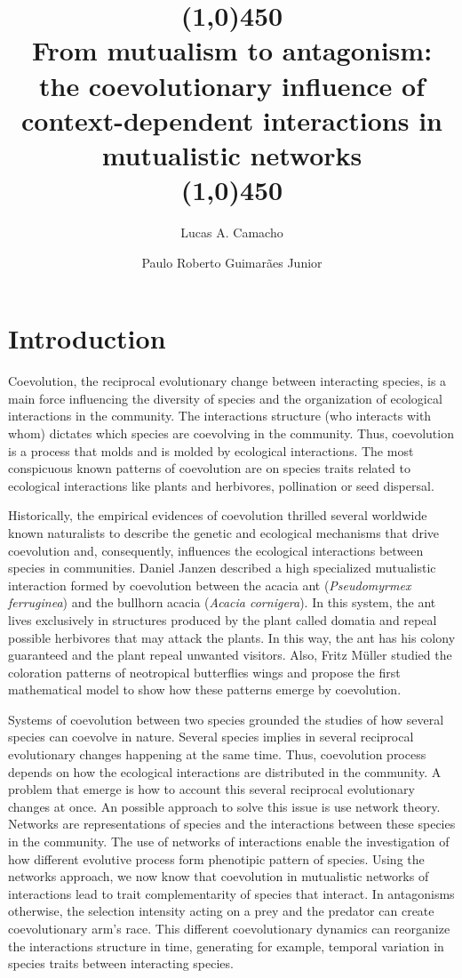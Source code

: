 \documentclass[a4paper, 12pt]{article}
\title{\vspace{-1.0cm} \line(1,0){450} \\From mutualism to antagonism: the coevolutionary influence of  context-dependent interactions in mutualistic networks\\\line(1,0){450}}
\author[1]{Lucas A. Camacho}
\author[2]{Paulo Roberto Guimarães Junior}
\date{}
\affil[1,2]{Departamento de Ecologia, Universidade de São Paulo, Rua do Matão, travessa 14, nº 321, Cidade Universitária, São Paulo - SP, CEP: 05508-090, Brasil.}
\begin{document}
\begingroup
\linespread{1.0}
\maketitle
\endgroup

\section{Introduction}
\linenumbers
Coevolution, the reciprocal evolutionary change between interacting species, is a main force influencing the diversity of species and the organization of ecological interactions in the community. The interactions structure (who interacts with whom) dictates which species are coevolving in the community. Thus, coevolution is a process that molds and is molded by ecological interactions. The most conspicuous known patterns of coevolution are on species traits related to ecological interactions like plants and herbivores, pollination or seed dispersal.

Historically, the empirical evidences of coevolution thrilled several worldwide known naturalists to describe the genetic and ecological mechanisms that drive coevolution and, consequently, influences the ecological interactions between species in communities. Daniel Janzen described a high specialized mutualistic interaction formed by coevolution between the acacia ant (\textit{Pseudomyrmex ferruginea}) and the bullhorn acacia (\textit{Acacia cornigera}). In this system, the ant lives exclusively in structures produced by the plant called domatia and repeal possible herbivores that may attack the plants. In this way, the ant has his colony guaranteed and the plant repeal unwanted visitors. Also, Fritz Müller studied the coloration patterns of neotropical butterflies wings and propose the first mathematical model to show how these patterns emerge by coevolution.

Systems of coevolution between two species  grounded the studies of how several species can coevolve in nature. Several species implies in several reciprocal evolutionary changes happening at the same time. Thus, coevolution process depends on how the ecological interactions are distributed in the community. A problem that emerge is how to account this several reciprocal evolutionary changes at once. An possible approach to solve this issue is use network theory. Networks are representations of species and the interactions between these species in the community. The use of networks of interactions enable the investigation of how different evolutive process form phenotipic pattern of species. Using the networks approach, we now know that coevolution in mutualistic networks of interactions lead to trait complementarity of species that interact. In antagonisms otherwise, the selection intensity acting on a prey and the predator can create coevolutionary arm's race. This different coevolutionary dynamics can reorganize the interactions structure in time, generating for example, temporal variation in species traits between interacting species.
\end{document}
